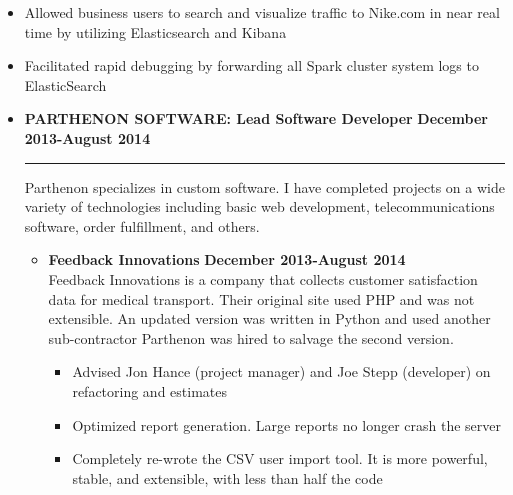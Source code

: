 \documentclass[overlapped]{res}
\begin{document}
\begin{resume}
\begin{itemize}[leftmargin=0in]
\begin{itemize}[leftmargin=0in]
\begin{samepage}
\begin{itemize}
                        \item[\textbullet] Allowed business users to search and visualize traffic to Nike.com in near real time by utilizing Elasticsearch and Kibana 
                        \item[\textbullet] Facilitated rapid debugging by forwarding all Spark cluster system logs to ElasticSearch
                    \end{itemize}
                \end{samepage}
        \end{itemize}
\end{itemize}
\vspace{0.25in}


\begin{itemize}[leftmargin=0in]
    \item[] 
        \textbf{PARTHENON SOFTWARE: Lead Software Developer} \hfill \textbf{December 2013-August 2014} \\[-0.1in] \rule{\textwidth}{0.5pt}
        Parthenon specializes in custom software. I have completed projects on a wide variety of technologies including basic 
        web development, telecommunications software, order fulfillment, and others. \vspace{0.125in}
        \begin{itemize}[leftmargin=0in]
            \item[] 
                \begin{samepage}
                    \textbf{Feedback Innovations} \hfill \textbf{December 2013-August 2014} \\
                    Feedback Innovations is a company that collects customer satisfaction data for medical transport. Their original site 
                    used PHP and was not extensible.  An updated version was written in Python and used another sub-contractor Parthenon 
                    was hired to salvage the second version.
                    \begin{itemize}
                        \item[\textbullet] Advised Jon Hance (project manager) and Joe Stepp (developer) on refactoring and estimates
                        \item[\textbullet] Optimized report generation. Large reports no longer crash the server
                        \item[\textbullet] Completely re-wrote the CSV user import tool. It is more powerful, stable, and extensible, with
                                           less than half the code

\end{itemize}
\end{samepage}
\end{itemize}
\end{itemize}
\end{resume}
\end{document}
